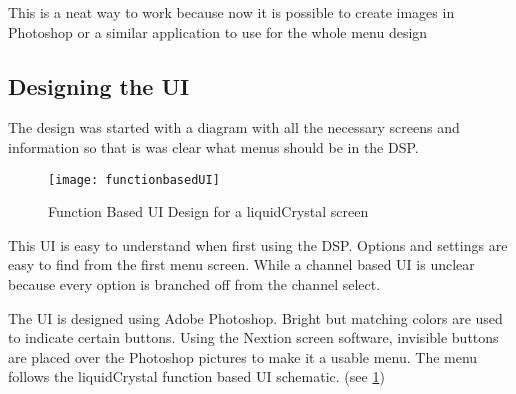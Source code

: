 This is a neat way to work because now it is possible to create images in Photoshop or a similar application to use for the whole menu design

\subsection{Designing the UI}
The design was started with a diagram with all the necessary screens and information so that is was clear what menus should be in the DSP. 

\begin{figure}[ht]
    \texttt{[image: functionbasedUI]}
    \caption{Function Based UI Design for a liquidCrystal screen}
    \label{fig:functionbasedUI}
\end{figure}

This UI is easy to understand when first using the DSP. Options and settings are easy to find from the first menu screen. While a channel based UI is unclear because every option is branched off from the channel select.
\par
\noindent The UI is designed using Adobe Photoshop. Bright but matching colors are used to indicate certain buttons. Using the Nextion screen software, invisible buttons are placed over the Photoshop pictures to make it a usable menu. The menu follows the liquidCrystal function based UI schematic. (see \ref{fig:functionbasedUI})




